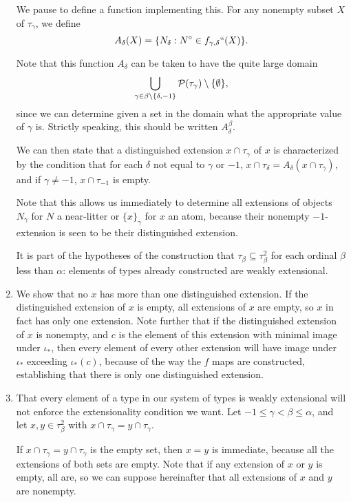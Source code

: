 \documentclass[12pt]{article}
\begin{document}
\begin{enumerate}
We pause to define a function implementing this.  For any nonempty subset $X$ of $\tau_\gamma$, we define $$A_\delta(X) =  \{N_\delta:N^\circ \in f_{\gamma,\delta}``(X)\}.$$

Note that this function $A_\delta$ can be taken to have the quite large domain $$\bigcup_{\gamma \in \beta \setminus \{\delta,-1\}} {\cal P}(\tau_\gamma) \setminus \{\emptyset\},$$ since we can determine given a set in the domain what the appropriate value of $\gamma$ is.
Strictly speaking, this should be written $A^{\beta}_{\delta}$.

We can then state that a distinguished extension $x \cap \tau_\gamma$ of $x$ is characterized by the condition that for each $\delta$ not equal to $\gamma$ or $-1$,
$x \cap \tau_\delta = A_\delta(x \cap \tau_\gamma)$, and if $\gamma \neq -1$, $x \cap \tau_{-1}$ is empty.

Note that this allows us immediately to determine all extensions of objects $N_\gamma$ for $N$ a near-litter or $\{x\}_\gamma$ for $x$ an atom, because their nonempty $-1$-extension is seen to be their distinguished extension.

It is part of the hypotheses of the construction that $\tau_\beta \subseteq \tau^2_\beta$ for each ordinal $\beta$ less than $\alpha$:  elements of types already constructed are weakly extensional.

\item We show that no $x$ has more than one distinguished extension.  If the distinguished extension of $x$ is empty, all extensions of $x$ are empty, so $x$ in fact has only one extension.  Note further that if the distinguished extension of $x$ is nonempty,
and $c$ is the element of this extension with minimal image under $\iota_*$, then every element of every other extension will have image under $\iota_*$ exceeding $\iota_*(c)$, because of the way the $f$ maps are constructed,  establishing that there is only one distinguished extension.

\item  That every element of a type in our system of types is weakly extensional will not enforce the extensionality condition we want.  Let $-1 \leq \gamma < \beta \leq \alpha$, and let
$x,y \in \tau^2_\beta$ with $x \cap \tau_\gamma = y \cap \tau_\gamma$.   

If $x \cap \tau_\gamma = y \cap \tau_\gamma$ is the empty set, then $x=y$ is immediate, because all the extensions of both sets are empty.  Note that if any extension
of $x$ or $y$ is empty, all are, so we can suppose hereinafter that all extensions of $x$ and $y$ are nonempty.


\end{enumerate}
\end{document}
